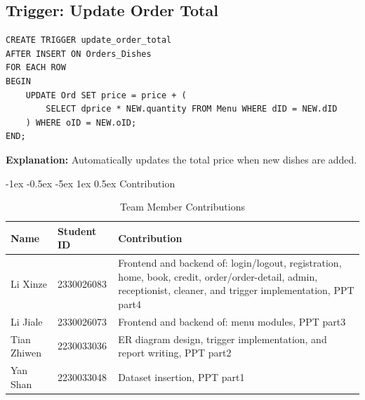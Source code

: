 \documentclass[12pt]{article}
\makeatletter
\renewcommand\section{\@startsection{section}{1}{\z@}%
    {-1ex \@plus -0.5ex \@minus -5ex} %
    {1ex \@plus 0.5ex} %
    {\normalfont\Large\bfseries}} %
\makeatother
\begin{document}
\subsection{Trigger: Update Order Total}
\begin{lstlisting}
CREATE TRIGGER update_order_total
AFTER INSERT ON Orders_Dishes
FOR EACH ROW
BEGIN
    UPDATE Ord SET price = price + (
        SELECT dprice * NEW.quantity FROM Menu WHERE dID = NEW.dID
    ) WHERE oID = NEW.oID;
END;
\end{lstlisting}
\textbf{Explanation:} Automatically updates the total price when new dishes are added.


\section{Contribution}

\begin{table}[H]
\centering
\caption{Team Member Contributions}
\begin{tabular}{llp{10cm}}
\toprule
\textbf{Name} & \textbf{Student ID} & \textbf{Contribution} \\
\midrule
Li Xinze & 2330026083 & Frontend and backend of: login/logout, registration, home, book, credit, order/order-detail, admin, receptionist, cleaner, and trigger implementation, PPT part4\\
Li Jiale & 2330026073 & Frontend and backend of:  menu modules, PPT part3 \\
Tian Zhiwen & 2230033036 & ER diagram design, trigger implementation, and report writing, PPT part2\\
Yan Shan & 2230033048 & Dataset insertion, PPT part1\\

\bottomrule
\end{tabular}
\end{table}
\end{document}
